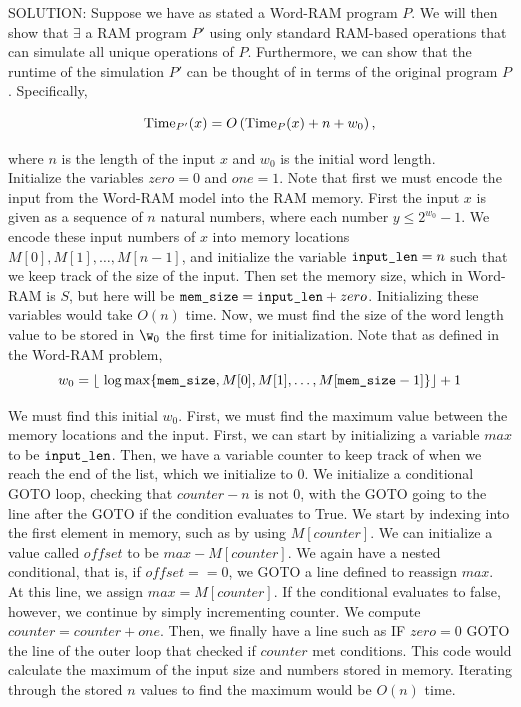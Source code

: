 \documentclass[11pt]{article}
\begin{document}
\begin{enumerate}
SOLUTION: Suppose we have as stated a Word-RAM program $P$. We will then show that $\exists$ a RAM program $P'$ using only standard RAM-based operations that can simulate all unique operations of $P$. Furthermore, we can show that the runtime of the simulation $P'$ can be thought of in terms of the original program $P$. Specifically, 

$$\mathrm{Time}_{P'}(x) = O\left(\mathrm{Time}_P(x)+n+w_0\right),$$

where $n$ is the length of the input $x$ and $w_0$ is the initial word length. \\

Initialize the variables $zero = 0$ and $one = 1$. Note that first we must encode the input from the Word-RAM model into the RAM memory. First the input $x$ is given as a sequence of $n$ natural numbers, where each number $y \leq 2^{w_0} - 1$. We encode these input numbers of $x$ into memory locations $M[0], M[1], \dots, M[n-1]$, and initialize the variable $\texttt{input\_len} = n$ such that we keep track of the size of the input. Then set the memory size, which in Word-RAM is $S$, but here will be $\texttt{mem\_size} = \texttt{input\_len} + zero$. Initializing these variables would take $O(n)$ time. Now, we must find the size of the word length value to be stored in $\w_0$ the first time for initialization. Note that as defined in the Word-RAM problem, 
$$w_0 = \lfloor \ \log \max\{\texttt{mem\_size}, M[0], M[1], \dots, M[\texttt{mem\_size}-1]\}\rfloor + 1$$

We must find this initial $w_0$. First, we must find the maximum value between the memory locations and the input. First, we can start by initializing a variable $max$ to be $\texttt{input\_len}$. Then, we have a variable counter to keep track of when we reach the end of the list, which we initialize to $0$. We initialize a conditional GOTO loop, checking that $counter - n$ is not $0$, with the GOTO going to the line after the GOTO if the condition evaluates to True.  We start by indexing into the first element in memory, such as by using $M[counter]$. We can initialize a value called $offset$ to be $max - M[counter]$. We again have a nested conditional, that is, if $offset == 0$, we GOTO a line defined to reassign $max$. At this line, we assign $max = M[counter]$. If the conditional evaluates to false, however, we continue by simply incrementing counter. We compute $counter = counter + one$. Then, we finally have a line such as IF $ zero = 0$ GOTO the line of the outer loop that checked if $counter$ met conditions. This code would calculate the maximum of the input size and numbers stored in memory. Iterating through the stored $n$ values to find the maximum would be $O(n)$ time. 


\end{enumerate}
\end{document}
